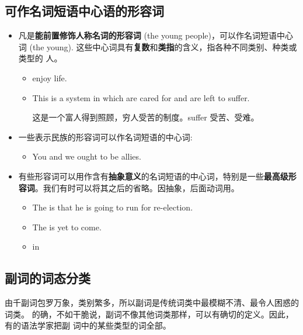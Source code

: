 \subsection{可作名词短语中心语的形容词}
\begin{itemize}
\item 凡是\textbf{能前置修饰人称名词的形容词} (the young people)，可以作名词短语中心
  词 (the young). 这些中心词具有\textbf{复数}和\textbf{类指}的含义，指各种不同类别、种类或类型的
  人。
  \begin{itemize}
  \item {} enjoy life.

  \item This is a system in which  are cared for and
     are left to suffer.

    这是一个富人得到照顾，穷人受苦的制度。suffer  受苦、受难。
  \end{itemize}
\item 一些表示民族的形容词可以作名词短语的中心词:
  \begin{itemize}
  \item You  and we  ought to be allies.
  \end{itemize}
\item 有些形容词可以用作含有\textbf{抽象意义}的名词短语的中心词，特别是一些\textbf{最高级形
    容词}。我们有时可以将其之后的省略。因抽象，后面动词用。
  \begin{itemize}
  \item The  is that he is going to run for re-election.

  \item The  is yet to come.

  \item in 
  \end{itemize}

\end{itemize}

\subsection{副词的词态分类}

由千副词包罗万象，类别繁多，所以副词是传统词类中最模糊不清、最令人困惑的词类。
的确，不如干脆说，副词不像其他词类那样，可以有确切的定义。因此，有的语法学家把副
词中的某些类型的词全部。

